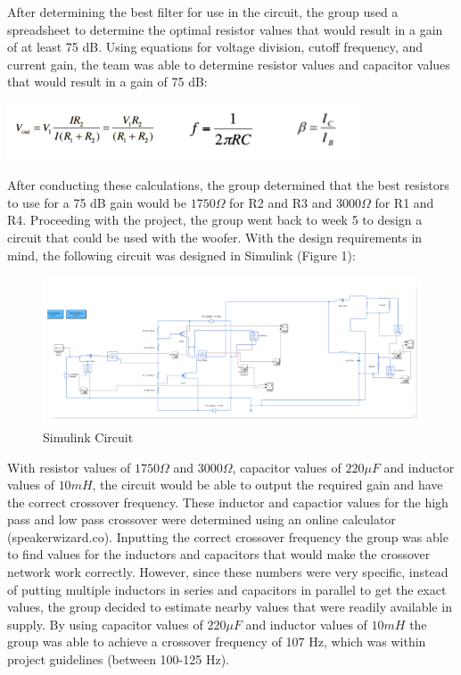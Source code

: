 \documentclass{article}
\begin{document}
\indent After determining the best filter for use in the circuit, the group used a spreadsheet to determine the optimal resistor values that would result in a gain of at least 75 dB. Using equations for voltage division, cutoff frequency, and current gain, the team was able to determine resistor values and capacitor values that would result in a gain of 75 dB:

\begin{center}
\includegraphics[width=400px]{Equations1.png}
\end{center}

After conducting these calculations, the group determined that the best resistors to use for a 75 dB gain would be $1750 \Omega$ for R2 and R3 and $3000 \Omega$ for R1 and R4. Proceeding with the project, the group went back to week 5 to design a circuit that could be used with the woofer. With the design requirements in mind, the following circuit was designed in Simulink (Figure 1):

\begin{figure}[h]
\begin{center}
\includegraphics[width=\textwidth]{SimulinkCircuit.png}
\caption{Simulink Circuit}
\end{center}
\end{figure}

With resistor values of $1750 \Omega$ and $3000 \Omega$, capacitor values of $220 \mu F$ and inductor values of $10mH$, the circuit would be able to output the required gain and have the correct crossover frequency. These inductor and capactior values for the high pass and low pass crossover were determined using an online calculator (speakerwizard.co). Inputting the correct crossover frequency the group was able to find values for the inductors and capacitors that would make the crossover network work correctly. However, since these numbers were very specific, instead of putting multiple inductors in series and capacitors in parallel to get the exact values, the group decided to estimate nearby values that were readily available in supply. By using capacitor values of $220 \mu F$ and inductor values of $10mH$ the group was able to achieve a crossover frequency of 107 Hz, which was within project guidelines (between 100-125 Hz). 
\newpage
\end{document}
